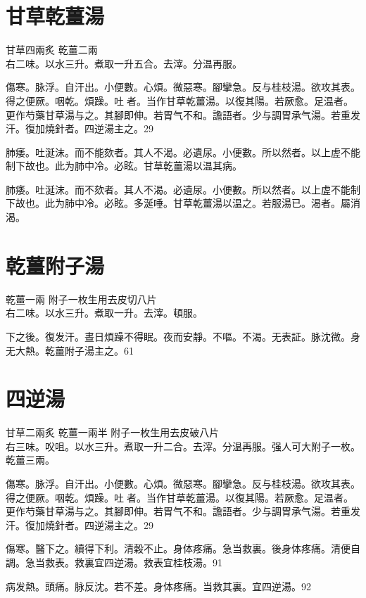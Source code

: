 \section{甘草乾薑湯}

甘草{\scriptsize 四兩炙} 乾薑{\scriptsize 二兩}\\
右二味。以水三升。煮取一升五合。去滓。分温再服。

傷寒。脉浮。自汗出。小便數。心煩。微惡寒。腳攣急。反与桂枝湯。欲攻其表。得之便厥。咽乾。煩躁。吐{\sungtpii 𠱘}者。当作甘草乾薑湯。以復其陽。若厥愈。足温者。更作芍藥甘草湯与之。其腳即伸。若胃气不和。譫語者。少与{\khaaitp 調胃}承气湯。若重发汗。復加燒針者。四逆湯主之。29

肺痿。吐涎沫。而不能欬者。其人不渴。必遺尿。小便數。所以然者。以上虗不能制下故也。此为肺中冷。必眩。甘草乾薑湯以温其病。{\wuben}

肺痿。吐涎沫。而不欬者。其人不渴。必遺尿。小便數。所以然者。以上虗不能制下故也。此为肺中冷。必眩。多涎唾。甘草乾薑湯以温之。若服湯已。渴者。屬消渴。{\dengben}

\section{乾薑附子湯}

乾薑{\scriptsize 一兩} 附子{\scriptsize 一枚生用去皮切八片}\\
右二味。以水三升。煮取一升。去滓。頓服。

下之後。復发汗。晝日煩躁不得眠。夜而安靜。不嘔。不渴。无表証。脉沈微。身无大熱。乾薑附子湯主之。61

\section{四逆湯}

甘草{\scriptsize 二兩炙} 乾薑{\scriptsize 一兩半} 附子{\scriptsize 一枚生用去皮破八片}\\
右三味。{\khaaitp 㕮咀。}以水三升。煮取一升二合。去滓。分温再服。强人可大附子一枚。乾薑三兩。

傷寒。脉浮。自汗出。小便數。心煩。微惡寒。腳攣急。反与桂枝湯。欲攻其表。得之便厥。咽乾。煩躁。吐{\sungtpii 𠱘}者。当作甘草乾薑湯。以復其陽。若厥愈。足温者。更作芍藥甘草湯与之。其腳即伸。若胃气不和。譫語者。少与{\khaaitp 調胃}承气湯。若重发汗。復加燒針者。四逆湯主之。29

傷寒。醫下之。續得下利。清穀不止。身体疼痛。急当救裏。後身体疼痛。清便自調。急当救表。救裏宜四逆湯。救表宜桂枝湯。91

病发熱。頭痛。脉反沈。若不差。身体疼痛。当救其裏。宜四逆湯。92


